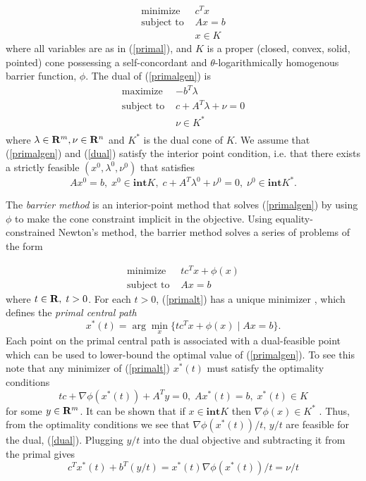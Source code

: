 \documentclass{article}
\begin{document}
\begin{equation}\label{primalgen}
  \begin{array}{ll}
    \mbox{minimize}    & c^Tx \\
    \mbox{subject to } & Ax = b \\
                       & x \in K
  \end{array}
\end{equation}
where all variables are as in (\ref{primal}), and $K$ is a proper (closed, convex, solid, pointed) cone 
possessing a self-concordant and $\theta$-logarithmically homogenous barrier function, $\phi$. The
dual of (\ref{primalgen}) is
\begin{equation}\label{dual}
  \begin{array}{ll}
    \mbox{maximize}    & -b^T\lambda \\
    \mbox{subject to } & c + A^T\lambda + \nu = 0 \\
                       & \nu \in K^* \\
  \end{array}
\end{equation}
where $\lambda\in \mathbf{R}^m, \nu \in \mathbf{R}^n$ and $K^*$ is the dual cone of $K$. We assume
that (\ref{primalgen}) and (\ref{dual}) satisfy the interior point condition, i.e. that there
exists a strictly feasible $(x^0,\lambda^0,\nu^0)$ that satisfies
\[
 Ax^0=b,\; x^0 \in \mathbf{int} K, \; c+ A^T\lambda^0 + \nu^0 = 0,\; \nu^0 \in \mathbf{int} K^*.
\]

The \emph{barrier method} is an interior-point method that solves (\ref{primalgen}) by using
$\phi$ to make the cone constraint implicit in the objective. Using equality-constrained
Newton's method, the barrier method solves a series of problems of the form

\begin{equation}\label{primalt}
  \begin{array}{ll}
    \mbox{minimize}    & tc^Tx + \phi(x)\\
    \mbox{subject to } & Ax = b
  \end{array}
\end{equation}
where $t \in \mathbf{R},\;t >0$. For each $t >0$, (\ref{primalt}) has a unique minimizer \cite{BoV:04},
which defines the \emph{primal central path}
\[
  x^*(t) = \arg\min_x\{tc^Tx + \phi(x) \mid Ax=b\}.
\]
Each point on the primal central path is associated with a dual-feasible point which
can be used to lower-bound the optimal value of (\ref{primalgen}). To see this note that
any minimizer of (\ref{primalt}) $x^*(t)$ must satisfy the
optimality conditions
\[
  tc + \nabla\phi(x^*(t)) + A^Ty = 0 ,\; Ax^*(t) = b ,\; x^*(t) \in K
\]
for some $y\in\mathbf{R}^m$. It can be shown that if  $x \in \mathbf{int} K$ then
$\nabla\phi(x) \in K^*$ \cite{alkire2002convex}. Thus, from the optimality conditions we 
see that $\nabla\phi(x^*(t))/t$, $y/t$ are feasible for the dual, (\ref{dual}).
Plugging $y/t$ into the dual objective and subtracting it from the primal gives
\[
  c^Tx^*(t) + b^T(y/t) =  x^*(t)\nabla\phi(x^*(t))/t = \nu/t
\]
\end{document}
